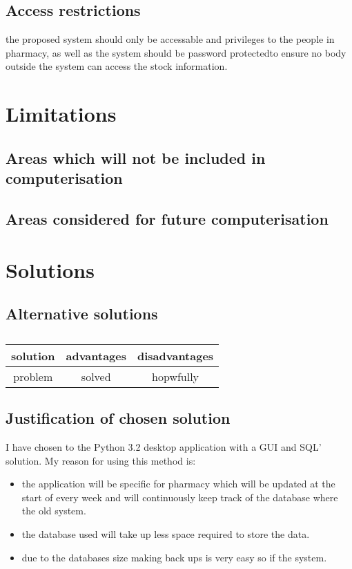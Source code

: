 \subsection{Access restrictions}
the proposed system should only be accessable and privileges to the people in pharmacy, as well as the system should be password protectedto ensure no body outside the system can access the stock information.
\space

\section{Limitations}

\subsection{Areas which will not be included in computerisation}

\subsection{Areas considered for future computerisation}

\section{Solutions}

\subsection{Alternative solutions} 
\begin{table}
\begin{tabular}{|c|c|c|}
\hline
solution & advantages & disadvantages\\
\hline
problem & solved & hopwfully\\
\hline
\end{tabular}
\caption{}
\label{tab:nonlin}
\end{table}
\subsection{Justification of chosen solution}
I have chosen to the Python 3.2 desktop application with a GUI and SQL' solution. My reason for using this method is:
\begin{itemize}
    \item the application will be specific for pharmacy which will be updated at the start of every week and will continuously keep track of the database where the old system.
    \item the database used will take up less space required to store the data.
    \item due to the databases size making back ups is very easy so if the system.
\end{itemize} 
